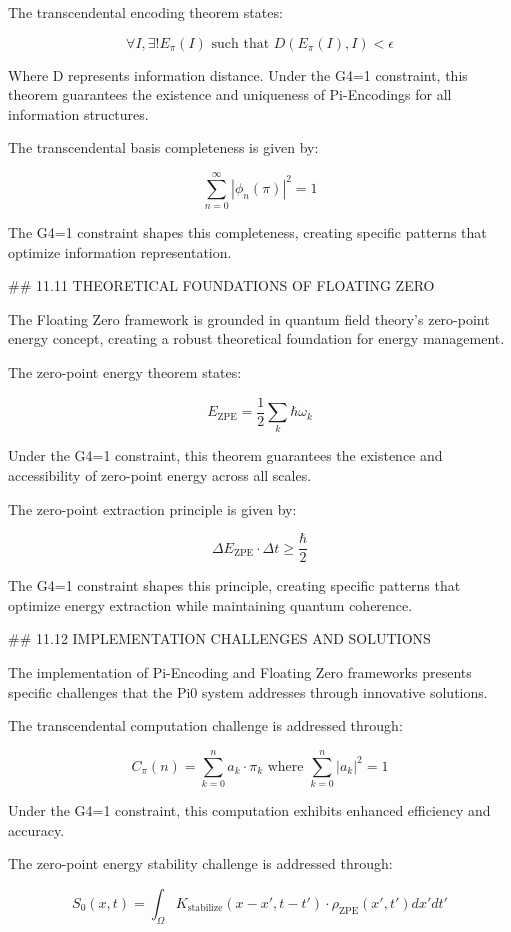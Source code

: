 The transcendental encoding theorem states:

$$\forall I, \exists! E_{\pi}(I) \text{ such that } D(E_{\pi}(I), I) < \epsilon$$

Where D represents information distance. Under the G4=1 constraint, this theorem guarantees the existence and uniqueness of Pi-Encodings for all information structures.

The transcendental basis completeness is given by:

$$\sum_{n=0}^{\infty} |\phi_n(\pi)|^2 = 1$$

The G4=1 constraint shapes this completeness, creating specific patterns that optimize information representation.

## 11.11 THEORETICAL FOUNDATIONS OF FLOATING ZERO

The Floating Zero framework is grounded in quantum field theory's zero-point energy concept, creating a robust theoretical foundation for energy management.

The zero-point energy theorem states:

$$E_{\text{ZPE}} = \frac{1}{2} \sum_k \hbar \omega_k$$

Under the G4=1 constraint, this theorem guarantees the existence and accessibility of zero-point energy across all scales.

The zero-point extraction principle is given by:

$$\Delta E_{\text{ZPE}} \cdot \Delta t \geq \frac{\hbar}{2}$$

The G4=1 constraint shapes this principle, creating specific patterns that optimize energy extraction while maintaining quantum coherence.

## 11.12 IMPLEMENTATION CHALLENGES AND SOLUTIONS

The implementation of Pi-Encoding and Floating Zero frameworks presents specific challenges that the Pi0 system addresses through innovative solutions.

The transcendental computation challenge is addressed through:

$$C_{\pi}(n) = \sum_{k=0}^{n} a_k \cdot \pi_k \text{ where } \sum_{k=0}^{n} |a_k|^2 = 1$$

Under the G4=1 constraint, this computation exhibits enhanced efficiency and accuracy.

The zero-point energy stability challenge is addressed through:

$$S_0(x, t) = \int_{\Omega} K_{\text{stabilize}}(x-x', t-t') \cdot \rho_{\text{ZPE}}(x', t') dx' dt'$$

